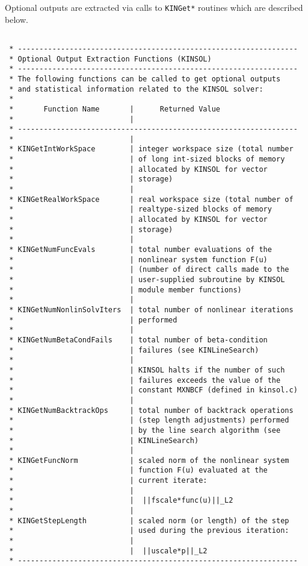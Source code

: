 \documentclass[11pt]{article}
\begin{document}
Optional outputs are extracted via calls to {\tt KINGet*} routines which
are described below.
\small
\begin{verbatim}

 * -----------------------------------------------------------------
 * Optional Output Extraction Functions (KINSOL)
 * -----------------------------------------------------------------
 * The following functions can be called to get optional outputs
 * and statistical information related to the KINSOL solver:
 *
 *       Function Name       |      Returned Value
 *                           |
 * -----------------------------------------------------------------
 *                           |
 * KINGetIntWorkSpace        | integer workspace size (total number
 *                           | of long int-sized blocks of memory
 *                           | allocated by KINSOL for vector
 *                           | storage)
 *                           |
 * KINGetRealWorkSpace       | real workspace size (total number of
 *                           | realtype-sized blocks of memory
 *                           | allocated by KINSOL for vector
 *                           | storage)
 *                           |
 * KINGetNumFuncEvals        | total number evaluations of the
 *                           | nonlinear system function F(u)
 *                           | (number of direct calls made to the
 *                           | user-supplied subroutine by KINSOL
 *                           | module member functions)
 *                           |
 * KINGetNumNonlinSolvIters  | total number of nonlinear iterations
 *                           | performed
 *                           |
 * KINGetNumBetaCondFails    | total number of beta-condition
 *                           | failures (see KINLineSearch)
 *                           |
 *                           | KINSOL halts if the number of such
 *                           | failures exceeds the value of the
 *                           | constant MXNBCF (defined in kinsol.c)
 *                           |
 * KINGetNumBacktrackOps     | total number of backtrack operations
 *                           | (step length adjustments) performed
 *                           | by the line search algorithm (see
 *                           | KINLineSearch)
 *                           |
 * KINGetFuncNorm            | scaled norm of the nonlinear system
 *                           | function F(u) evaluated at the
 *                           | current iterate:
 *                           |
 *                           |  ||fscale*func(u)||_L2
 *                           |
 * KINGetStepLength          | scaled norm (or length) of the step
 *                           | used during the previous iteration:
 *                           |
 *                           |  ||uscale*p||_L2
 * -----------------------------------------------------------------


\end{verbatim}
\end{document}
